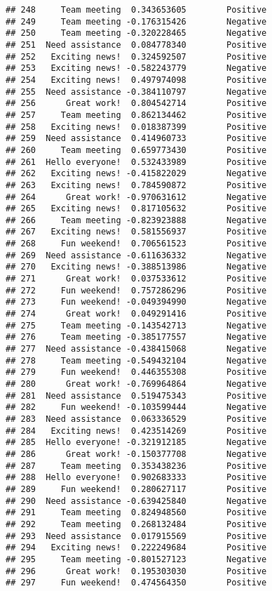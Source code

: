 \documentclass[
]{article}
\begin{document}
\begin{verbatim}
## 248     Team meeting  0.343653605        Positive
## 249     Team meeting -0.176315426        Negative
## 250     Team meeting -0.320228465        Negative
## 251  Need assistance  0.084778340        Positive
## 252   Exciting news!  0.324592507        Positive
## 253   Exciting news! -0.582243779        Negative
## 254   Exciting news!  0.497974098        Positive
## 255  Need assistance -0.384110797        Negative
## 256      Great work!  0.804542714        Positive
## 257     Team meeting  0.862134462        Positive
## 258   Exciting news!  0.018387399        Positive
## 259  Need assistance  0.414960733        Positive
## 260     Team meeting  0.659773430        Positive
## 261  Hello everyone!  0.532433989        Positive
## 262   Exciting news! -0.415822029        Negative
## 263   Exciting news!  0.784590872        Positive
## 264      Great work! -0.970631612        Negative
## 265   Exciting news!  0.817105632        Positive
## 266     Team meeting -0.823923888        Negative
## 267   Exciting news!  0.581556937        Positive
## 268     Fun weekend!  0.706561523        Positive
## 269  Need assistance -0.611636332        Negative
## 270   Exciting news! -0.388513986        Negative
## 271      Great work!  0.037533612        Positive
## 272     Fun weekend!  0.757286296        Positive
## 273     Fun weekend! -0.049394990        Negative
## 274      Great work!  0.049291416        Positive
## 275     Team meeting -0.143542713        Negative
## 276     Team meeting -0.385177557        Negative
## 277  Need assistance -0.438415068        Negative
## 278     Team meeting -0.549432104        Negative
## 279     Fun weekend!  0.446355308        Positive
## 280      Great work! -0.769964864        Negative
## 281  Need assistance  0.519475343        Positive
## 282     Fun weekend! -0.103599444        Negative
## 283  Need assistance  0.063336529        Positive
## 284   Exciting news!  0.423514269        Positive
## 285  Hello everyone! -0.321912185        Negative
## 286      Great work! -0.150377708        Negative
## 287     Team meeting  0.353438236        Positive
## 288  Hello everyone!  0.902683333        Positive
## 289     Fun weekend!  0.280627117        Positive
## 290  Need assistance -0.639425840        Negative
## 291     Team meeting  0.824948560        Positive
## 292     Team meeting  0.268132484        Positive
## 293  Need assistance  0.017915569        Positive
## 294   Exciting news!  0.222249684        Positive
## 295     Team meeting -0.801527123        Negative
## 296      Great work!  0.195303030        Positive
## 297     Fun weekend!  0.474564350        Positive

\end{verbatim}
\end{document}
